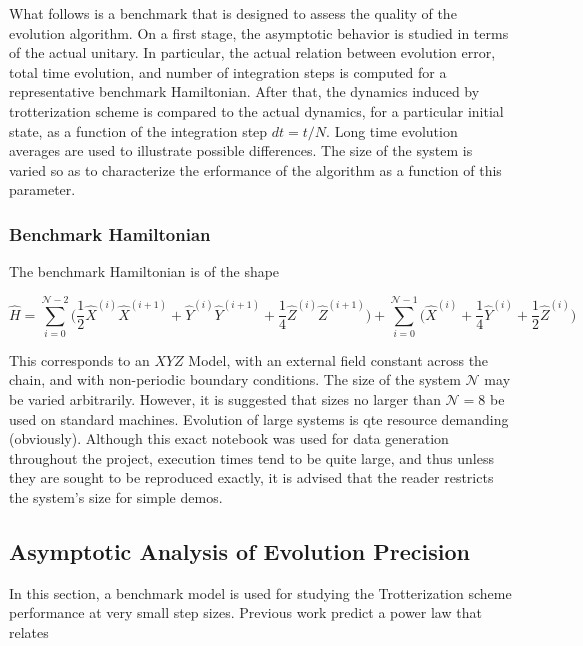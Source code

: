 What follows is a benchmark that is designed to assess the quality of
the evolution algorithm. On a first stage, the asymptotic behavior is
studied in terms of the actual unitary. In particular, the actual
relation between evolution error, total time evolution, and number of
integration steps is computed for a representative benchmark
Hamiltonian. After that, the dynamics induced by trotterization scheme
is compared to the actual dynamics, for a particular initial state, as a
function of the integration step \(dt = t/N\). Long time evolution
averages are used to illustrate possible differences. The size of the
system is varied so as to characterize the erformance of the algorithm
as a function of this parameter.

\hypertarget{benchmark-hamiltonian}{%
\subsubsection{Benchmark Hamiltonian}\label{benchmark-hamiltonian}}

The benchmark Hamiltonian is of the shape

\[
\hat{H} = \sum_{i=0}^{\mathcal{N}-2} \bigg(\frac{1}{2}\hat{X}^{(i)}\hat{X}^{(i+1)} + \hat{Y}^{(i)}\hat{Y}^{(i+1)} + \frac{1}{4}\hat{Z}^{(i)}\hat{Z}^{(i+1)} \bigg) + \sum_{i=0}^{\mathcal{N}-1} \bigg(\hat{X}^{(i)} + \frac{1}{4} \hat{Y}^{(i)} + \frac{1}{2} \hat{Z}^{(i)} \bigg)
\]

This corresponds to an \(XYZ\) Model, with an external field constant
across the chain, and with non-periodic boundary conditions. The size of
the system \(\mathcal{N}\) may be varied arbitrarily. However, it is
suggested that sizes no larger than \(\mathcal{N} = 8\) be used on
standard machines. Evolution of large systems is qte resource demanding
(obviously). Although this exact notebook was used for data generation
throughout the project, execution times tend to be quite large, and thus
unless they are sought to be reproduced exactly, it is advised that the
reader restricts the system's size for simple demos.

    \hypertarget{asymptotic-analysis-of-evolution-precision}{%
\subsection{Asymptotic Analysis of Evolution
Precision}\label{asymptotic-analysis-of-evolution-precision}}

In this section, a benchmark model is used for studying the
Trotterization scheme performance at very small step sizes. Previous
work predict a power law that relates

